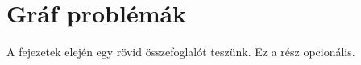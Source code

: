\chapter{Gráf problémák}\label{ch:ALAP}

\begin{osszefoglal}
	A fejezetek elején egy rövid összefoglalót teszünk. Ez a rész opcionális.
	
\end{osszefoglal}

